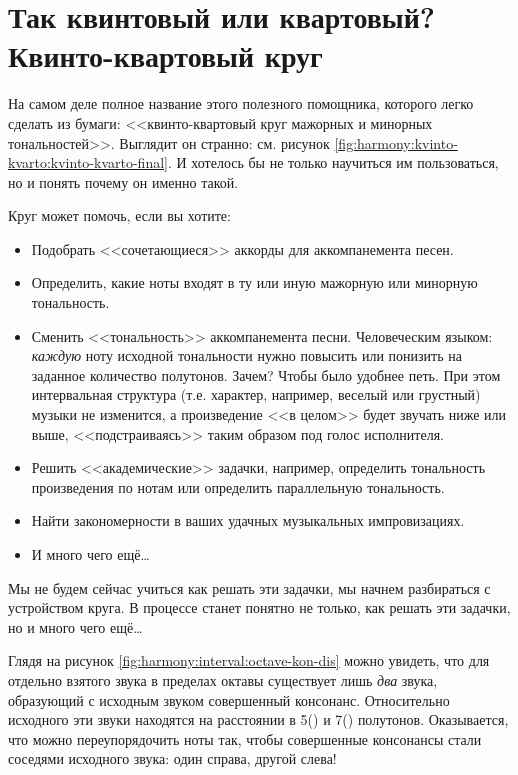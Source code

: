 \section{Так квинтовый или квартовый? Квинто-квартовый круг}
\label{ch:harmony:kvinto-kvarto-round}

На самом деле полное название этого полезного помощника, которого легко сделать из бумаги: <<квинто-квартовый круг мажорных и минорных тональностей>>. Выглядит он странно: см. рисунок \ref{fig:harmony:kvinto-kvarto:kvinto-kvarto-final}. И хотелось бы не только научиться им пользоваться, но и понять почему он именно такой.

Круг может помочь, если вы хотите:
\begin{itemize}
    \item Подобрать <<сочетающиеся>> аккорды для аккомпанемента песен.
    
    \item Определить, какие ноты входят в ту или иную мажорную или минорную тональность.
    
    \item Сменить <<тональность>> аккомпанемента песни. Человеческим языком: \emph{каждую} ноту исходной тональности нужно повысить или понизить на заданное количество полутонов. Зачем? Чтобы было удобнее петь. При этом интервальная структура (т.е. характер, например, веселый или грустный) музыки не изменится, а произведение <<в целом>> будет звучать ниже или выше, <<подстраиваясь>> таким образом под голос исполнителя.    

    \item Решить <<академические>> задачки, например, определить тональность произведения по нотам или определить параллельную тональность.
    
    \item Найти закономерности в ваших удачных музыкальных импровизациях.
    
    \item И много чего ещё\ldots
\end{itemize}

Мы не будем сейчас учиться как решать эти задачки, мы начнем разбираться с устройством круга. В процессе станет понятно не только, как решать эти задачки, но и много чего ещё\ldots

Глядя на рисунок \ref{fig:harmony:interval:octave-kon-dis} можно увидеть, что для отдельно взятого звука в пределах октавы существует лишь \emph{два} звука, образующий с исходным звуком совершенный консонанс. Относительно исходного эти звуки находятся на расстоянии в 5() и 7() полутонов. Оказывается, что можно переупорядочить ноты так, чтобы совершенные консонансы стали соседями исходного звука: один справа, другой слева!

